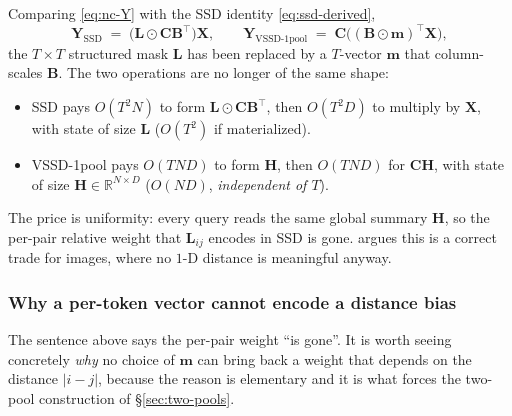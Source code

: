 \documentclass[11pt,a4paper]{article}
\begin{document}
Comparing \eqref{eq:nc-Y} with the SSD identity
\eqref{eq:ssd-derived},
\begin{equation}
  \bm{Y}_{\text{SSD}} \;=\; \bigl(\bm{L}\odot\bm{C}\bm{B}^\top\bigr)\bm{X},
  \qquad
  \bm{Y}_{\text{VSSD-1pool}} \;=\; \bm{C}\bigl((\bm{B}\odot\bm{m})^\top\bm{X}\bigr),
\end{equation}
the $T\times T$ structured mask $\bm{L}$ has been replaced by a
$T$-vector $\bm{m}$ that column-scales $\bm{B}$. The two operations
are no longer of the same shape:
\begin{itemize}
  \item SSD pays $O(T^2 N)$ to form $\bm{L}\odot\bm{C}\bm{B}^\top$,
        then $O(T^2 D)$ to multiply by $\bm{X}$, with state of size
        $\bm{L}$ ($O(T^2)$ if materialized).
  \item VSSD-1pool pays $O(TND)$ to form $\bm{H}$, then $O(TND)$ for
        $\bm{C}\bm{H}$, with state of size $\bm{H}\in\mathbb{R}^{N\times D}$
        ($O(ND)$, \emph{independent of $T$}).
\end{itemize}
The price is uniformity: every query reads the same global summary
$\bm{H}$, so the per-pair relative weight that $\bm{L}_{ij}$ encodes
in SSD is gone. \cite{vssd} argues this is a correct trade for
images, where no $1$-D distance is meaningful anyway.

\subsubsection{Why a per-token vector cannot encode a distance bias}
\label{sec:no-distance-bias}

The sentence above says the per-pair weight ``is gone''. It is worth seeing
concretely \emph{why} no choice of $\bm{m}$ can bring back a weight that
depends on the distance $|i-j|$, because the reason is elementary and it is
what forces the two-pool construction of \S\ref{sec:two-pools}.
\end{document}
